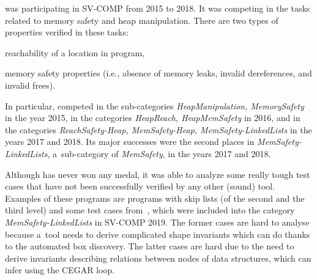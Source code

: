 {\forester{} was participating in SV-COMP from 2015 to 2018.
It was competing in the tasks related to memory safety and heap manipulation.
There are two types of properties verified in these tasks:
\begin{enumerate*}
  \item reachability of a location in program,
  \item memory safety properties (i.e., absence of memory leaks, invalid dereferences, and invalid frees).
\end{enumerate*}

In particular,
\forester{} competed in the sub-categories \emph{HeapManipulation, MemorySafety} in the year 2015,
in the categories \emph{HeapReach, HeapMemSafety} in 2016, and
in the categories \emph{ReachSafety-Heap, MemSafety-Heap, MemSafety-LinkedLists} in the years 2017 and 2018.
Its major successes were the second places in \emph{MemSafety-LinkedLists},
a~sub-category of \emph{MemSafety}, in the years 2017 and 2018.

Although \forester{} has never won any medal, it was able to analyze
some really tough test cases that have not been successfully verified by any
other (sound) tool.
Examples of these programs are programs with skip lists (of the second and the
third level) and some test cases from~\cite{vmcai17}, which were included into the
category \emph{MemSafety-LinkedLists} in SV-COMP 2019.
The former cases are hard to analyse because a~tool needs to derive
complicated shape invariants which \forester{} can do thanks to the automated
box discovery.
The latter cases are hard due to the need to derive invariants describing relations
between nodes of data structures, which \forester{} can infer using the CEGAR
loop.

}
